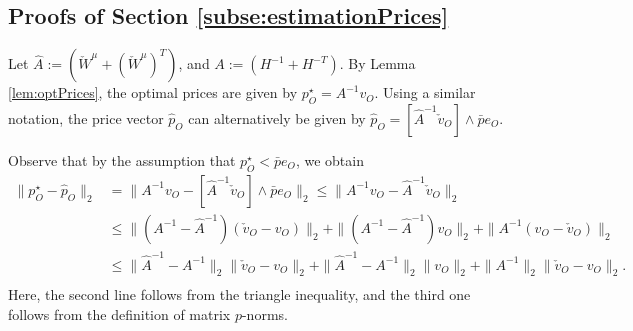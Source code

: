 \documentclass[opre,nonblindrev]{informs3} %
\begin{document}
\begin{APPENDIX}{}
\section{Proofs of Section \ref{subse:estimationPrices}}
   \noindent{}
   Let $\hat A := ( \check{W}^\mu+ (\check{W}^\mu)^T)$, and  $A := (H^{-1}+H^{-T})$.
   By Lemma \ref{lem:optPrices}, the   optimal prices are given by
   ${{p}}_O^\star=A^{-1}  {v}_O$.
   Using a similar notation, the price vector $\hat {{p}}_O$ can alternatively be given by
   $\hat {{p}}_O=[\hat{A}^{-1} \check{{v}}_O] \wedge {\bar{p}} {e}_O$.

   Observe that by the assumption that ${{p}}_O^\star< \bar{p}{e}_O$, we obtain
   \begin{equation}\label{eq:price1NormBound}
   \begin{aligned}
   \|   {{p}}_O^\star- \hat{{p}}_O \| _2  & =
   \|A^{-1} {v}_O -  [\hat{A}^{-1} \check{{v}}_O]\wedge {\bar{p}} {e}_O\|_2 \leq
   \|A^{-1} {v}_O -  \hat{A}^{-1} \check{{v}}_O\|_2 \\
   & \leq \| ( A^{-1} - \hat A^{-1}) (\check{{{v}}}_O -{{v}}_O) \|_2 + \| (A^{-1} - \hat A^{-1}) {{v}}_O \|_2 + \|A^{-1} ({{v}}_O-\check{{{v}}}_O) \|_2 \\
   & \leq \| \hat A^{-1} - A^{-1}\|_2  \|  \check{{{v}}}_O -{{v}}_O  \|_2 + \| \hat A^{-1} - A^{-1} \|_2 \|{{v}}_O\|_2+ \|A^{-1}\|_2  \| \check{{{v}}}_O -{{v}}_O \|_2. \\
   \end{aligned}
   \end{equation}
   Here, the second line follows from the triangle inequality, and the third one follows from the definition of matrix $p$-norms.


\end{APPENDIX}
\end{document}
